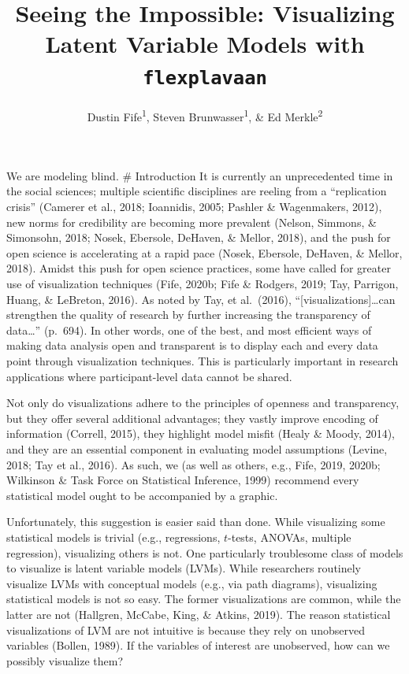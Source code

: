 \documentclass[
  english,
  doc]{apa6}
\title{Seeing the Impossible: Visualizing Latent Variable Models with \texttt{flexplavaan}}
\author{Dustin Fife\textsuperscript{1}, Steven Brunwasser\textsuperscript{1}, \& Ed Merkle\textsuperscript{2}}
\date{}
\affiliation{\vspace{0.5cm}\textsuperscript{1} Rowan University\\\textsuperscript{2} University of Missouri}
\begin{document}
\maketitle

We are modeling blind.
\# Introduction
It is currently an unprecedented time in the social sciences; multiple scientific disciplines are reeling from a ``replication crisis'' (Camerer et al., 2018; Ioannidis, 2005; Pashler \& Wagenmakers, 2012), new norms for credibility are becoming more prevalent (Nelson, Simmons, \& Simonsohn, 2018; Nosek, Ebersole, DeHaven, \& Mellor, 2018), and the push for open science is accelerating at a rapid pace (Nosek, Ebersole, DeHaven, \& Mellor, 2018). Amidst this push for open science practices, some have called for greater use of visualization techniques (Fife, 2020b; Fife \& Rodgers, 2019; Tay, Parrigon, Huang, \& LeBreton, 2016). As noted by Tay, et al.~(2016), ``{[}visualizations{]}\ldots can strengthen the quality of research by further increasing the transparency of data\ldots{}'' (p.~694). In other words, one of the best, and most efficient ways of making data analysis open and transparent is to display each and every data point through visualization techniques. This is particularly important in research applications where participant-level data cannot be shared.

Not only do visualizations adhere to the principles of openness and transparency, but they offer several additional advantages; they vastly improve encoding of information (Correll, 2015), they highlight model misfit (Healy \& Moody, 2014), and they are an essential component in evaluating model assumptions (Levine, 2018; Tay et al., 2016). As such, we (as well as others, e.g., Fife, 2019, 2020b; Wilkinson \& Task Force on Statistical Inference, 1999) recommend every statistical model ought to be accompanied by a graphic.

Unfortunately, this suggestion is easier said than done. While visualizing some statistical models is trivial (e.g., regressions, \(t\)-tests, ANOVAs, multiple regression), visualizing others is not. One particularly troublesome class of models to visualize is latent variable models (LVMs). While researchers routinely visualize LVMs with conceptual models (e.g., via path diagrams), visualizing statistical models is not so easy. The former visualizations are common, while the latter are not (Hallgren, McCabe, King, \& Atkins, 2019). The reason statistical visualizations of LVM are not intuitive is because they rely on unobserved variables (Bollen, 1989). If the variables of interest are unobserved, how can we possibly visualize them?
\end{document}

